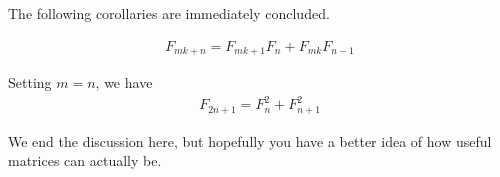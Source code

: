\documentclass{subfile}
\begin{document}
The following corollaries are immediately concluded.

\begin{corollary}
\begin{align*}
F_{mk+n}=F_{mk+1}F_n+F_{mk}F_{n-1}
\end{align*}
\end{corollary}

\begin{corollary}
Setting $m=n$, we have
\begin{align*}
F_{2n+1}=F_n^2+F_{n+1}^2
\end{align*}
\end{corollary}

We end the discussion here, but hopefully you have a better idea of how useful matrices can actually be.
\end{document}
